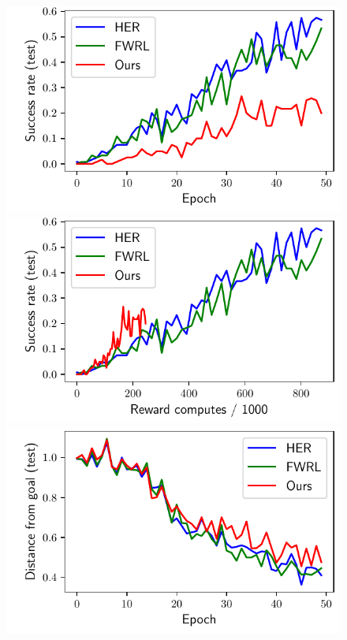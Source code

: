 \begin{figure}
  \includegraphics[width=\frac\columnwidth]{media/res/6efc1de-path_reward_low_thresh_chosen-HandManipulateBlockRotateXYZPR-v0-dqst/epoch-test/success_rate.pdf}%
  \includegraphics[width=\frac\columnwidth]{media/res/6efc1de-path_reward_low_thresh_chosen-HandManipulateBlockRotateXYZPR-v0-dqst/reward_computes-test/success_rate.pdf}\\
  \includegraphics[width=\frac\columnwidth]{media/res/6efc1de-path_reward_low_thresh_chosen-HandManipulateEggFullPR-v0-dqst/epoch-test/ag_g_dist.pdf}%

\end{figure}
